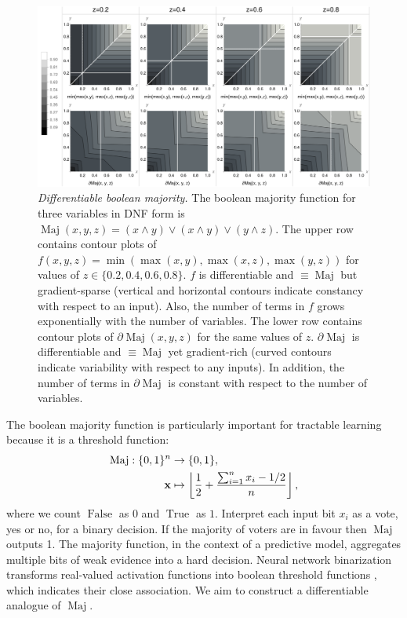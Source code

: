 \documentclass{article} %
\begin{document}
\begin{figure}[t]
	\centering
	\includegraphics[trim=0pt 0pt 0pt 0pt, clip, width=1.0\textwidth]{majority-gates.png}
	\caption{{\em Differentiable boolean majority.} The boolean majority function for three variables in DNF form is $\operatorname{Maj}(x,y,z) = (x \wedge y) \vee (x \wedge y) \vee (y \wedge z)$. The upper row contains contour plots of $f(x,y,z) = \operatorname{min}(\operatorname{max}(x,y), \operatorname{max}(x,z), \operatorname{max}(y,z))$ for values of $z \in \{0.2, 0.4, 0.6, 0.8\}$. $f$ is differentiable and $\equiv \operatorname{Maj}$ but gradient-sparse (vertical and horizontal contours indicate constancy with respect to an input). Also, the number of terms in $f$ grows exponentially with the number of variables. The lower row contains contour plots of $\partial\!\operatorname{Maj}(x,y,z)$ for the same values of $z$. $\partial\!\operatorname{Maj}$ is differentiable and $\equiv \operatorname{Maj}$ yet gradient-rich (curved contours indicate variability with respect to any inputs). In addition, the number of terms in $\partial\!\operatorname{Maj}$ is constant with respect to the number of variables.} 
	\label{fig:majority-plot}
\end{figure}

The boolean majority function is particularly important for tractable learning because it is a threshold function:
\begin{equation*}
\begin{aligned}
\operatorname{Maj}: \{0,1\}^{n} &\to \{0,1\},\\
{\bf x} &\mapsto \left\lfloor
\frac{1}{2} + \frac{\sum_{i=1}^{n} x_{i} - 1/2}{n}
\right\rfloor\text{,}
\end{aligned}
\end{equation*}
where we count $\operatorname{False}$ as $0$ and $\operatorname{True}$ as $1$. Interpret each input bit $x_{i}$ as a vote, yes or no, for a binary decision. If the majority of voters are in favour then $\operatorname{Maj}$ outputs 1. The majority function, in the context of a predictive model, aggregates multiple bits of weak evidence into a hard decision. Neural network binarization transforms real-valued activation functions into boolean threshold functions \citep{10.5555/3157382.3157557}, which indicates their close association. We aim to construct a differentiable analogue of $\operatorname{Maj}$.
\end{document}
